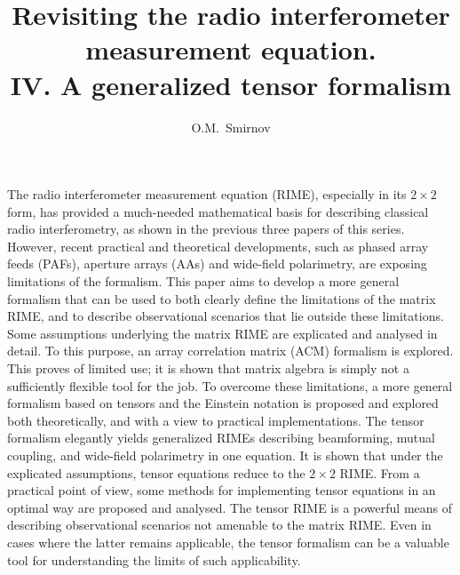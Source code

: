 \documentclass[]{aa}
\begin{document}
\title{Revisiting the radio interferometer measurement equation.\\IV. A generalized tensor formalism}

\author{O.M.\ Smirnov}


\date{}


\abstract%
{The radio interferometer measurement equation (RIME), especially in its $2\times2$ form, has provided a much-needed mathematical basis for describing classical radio interferometry, as shown in the previous three papers of this series. However, recent practical and theoretical developments, such as phased array feeds (PAFs), aperture arrays (AAs) and wide-field polarimetry, are exposing limitations of the formalism.
}
{This paper aims to develop a more general formalism that can be used to both clearly define the limitations of the matrix RIME, and
to describe observational scenarios that lie outside these limitations.
}
{Some assumptions underlying the matrix RIME are explicated and analysed in detail. To this purpose, an array correlation matrix (ACM) formalism is explored. This proves of limited use; it is shown that matrix algebra is simply not a sufficiently flexible tool for the job. To overcome these limitations, a more general formalism based on tensors and the Einstein notation is proposed and explored both theoretically, and with a view to practical implementations.
}%
{The tensor formalism elegantly yields generalized RIMEs describing beamforming, mutual coupling, and wide-field polarimetry in one equation. It is shown that under the explicated assumptions, tensor equations reduce to the $2\times2$ RIME. From a practical point of view, some methods for implementing tensor equations in an optimal way are proposed and analysed.
}%
{The tensor RIME is a powerful means of describing observational scenarios not amenable to the matrix RIME. Even in cases where the latter 
remains applicable, the tensor formalism can be a valuable tool for understanding the limits of such applicability.
}

\end{document}
